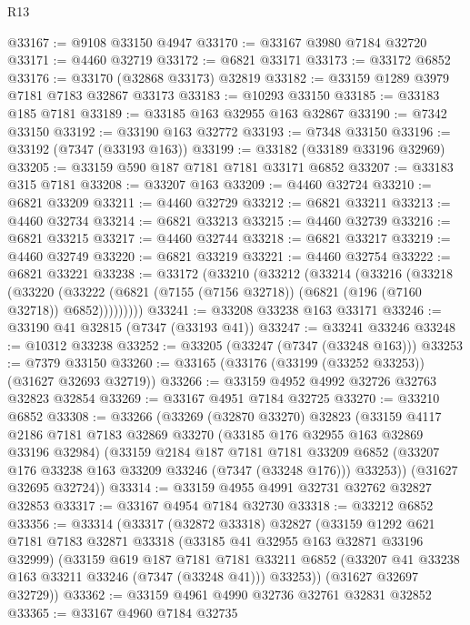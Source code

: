 \begin{lexlean}{R13}
\begin{coremodule}
@33167 := @9108 @33150 @4947
@33170 := @33167 @3980 @7184 @32720
@33171 := @4460 @32719
@33172 := @6821 @33171
@33173 := @33172 @6852
@33176 := @33170 (@32868 @33173) @32819
@33182 := @33159 @1289 @3979 @7181 @7183 @32867 @33173
@33183 := @10293 @33150
@33185 := @33183 @185 @7181
@33189 := @33185 @163 @32955 @163 @32867
@33190 := @7342 @33150
@33192 := @33190 @163 @32772
@33193 := @7348 @33150
@33196 := @33192 (@7347 (@33193 @163))
@33199 := @33182 (@33189 @33196 @32969)
@33205 := @33159 @590 @187 @7181 @7181 @33171 @6852
@33207 := @33183 @315 @7181
@33208 := @33207 @163
@33209 := @4460 @32724
@33210 := @6821 @33209
@33211 := @4460 @32729
@33212 := @6821 @33211
@33213 := @4460 @32734
@33214 := @6821 @33213
@33215 := @4460 @32739
@33216 := @6821 @33215
@33217 := @4460 @32744
@33218 := @6821 @33217
@33219 := @4460 @32749
@33220 := @6821 @33219
@33221 := @4460 @32754
@33222 := @6821 @33221
@33238 := @33172
    (@33210
      (@33212
        (@33214
          (@33216
            (@33218
              (@33220
                (@33222 (@6821 (@7155 (@7156 @32718)) (@6821 (@196 (@7160 @32718)) @6852)))))))))
@33241 := @33208 @33238 @163 @33171
@33246 := @33190 @41 @32815 (@7347 (@33193 @41))
@33247 := @33241 @33246
@33248 := @10312 @33238
@33252 := @33205 (@33247 (@7347 (@33248 @163)))
@33253 := @7379 @33150
@33260 := @33165 (@33176 (@33199 (@33252 @33253)) (@31627 @32693 @32719))
@33266 := @33159 @4952 @4992 @32726 @32763 @32823 @32854
@33269 := @33167 @4951 @7184 @32725
@33270 := @33210 @6852
@33308 := @33266
    (@33269
      (@32870 @33270)
      @32823
      (@33159
        @4117
        @2186
        @7181
        @7183
        @32869
        @33270
        (@33185 @176 @32955 @163 @32869 @33196 @32984)
        (@33159
          @2184
          @187
          @7181
          @7181
          @33209
          @6852
          (@33207 @176 @33238 @163 @33209 @33246 (@7347 (@33248 @176)))
          @33253))
      (@31627 @32695 @32724))
@33314 := @33159 @4955 @4991 @32731 @32762 @32827 @32853
@33317 := @33167 @4954 @7184 @32730
@33318 := @33212 @6852
@33356 := @33314
    (@33317
      (@32872 @33318)
      @32827
      (@33159
        @1292
        @621
        @7181
        @7183
        @32871
        @33318
        (@33185 @41 @32955 @163 @32871 @33196 @32999)
        (@33159
          @619
          @187
          @7181
          @7181
          @33211
          @6852
          (@33207 @41 @33238 @163 @33211 @33246 (@7347 (@33248 @41)))
          @33253))
      (@31627 @32697 @32729))
@33362 := @33159 @4961 @4990 @32736 @32761 @32831 @32852
@33365 := @33167 @4960 @7184 @32735

\end{coremodule}
\end{lexlean}
